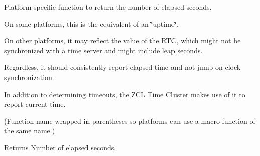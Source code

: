 Platform-\/specific function to return the number of elapsed seconds. 

On some platforms, this is the equivalent of an \char`\"{}uptime\char`\"{}.

On other platforms, it may reflect the value of the R\+TC, which might not be synchronized with a time server and might include leap seconds.

Regardless, it should consistently report elapsed time and not jump on clock synchronization.

In addition to determining timeouts, the \hyperlink{group__zcl__time}{Z\+CL Time Cluster} makes use of it to report current time.

(Function name wrapped in parentheses so platforms can use a macro function of the same name.)

\begin{DoxyReturn}{Returns}
Number of elapsed seconds. 
\end{DoxyReturn}
